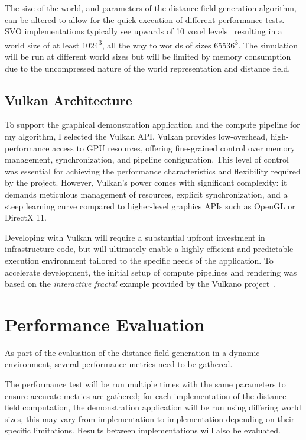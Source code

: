 The size of the world, and parameters of the distance field generation algorithm, can be altered to allow for the quick
execution of different performance tests. SVO implementations typically see upwards of 10 voxel
levels~\cite{laine2010efficient} resulting in a world size of at least 1024\textsuperscript{3}, all the way to worlds of
sizes 65536\textsuperscript{3}. The simulation will be run at different world sizes but will be limited by memory
consumption due to the uncompressed nature of the world representation and distance field.

\subsection{Vulkan Architecture}
To support the graphical demonstration application and the compute pipeline for my algorithm, I selected the Vulkan API.
Vulkan provides low-overhead, high-performance access to GPU resources, offering fine-grained control over memory
management, synchronization, and pipeline configuration. This level of control was essential for achieving the
performance characteristics and flexibility required by the project. However, Vulkan's power comes with significant
complexity: it demands meticulous management of resources, explicit synchronization, and a steep learning curve compared
to higher-level graphics APIs such as OpenGL or DirectX 11.

Developing with Vulkan will require a substantial upfront investment in infrastructure code, but will ultimately enable
a highly efficient and predictable execution environment tailored to the specific needs of the application. To
accelerate development, the initial setup of compute pipelines and rendering was based on the
\textit{interactive fractal} example provided by the Vulkano project~\cite{vulkano-example}.

\section{Performance Evaluation}\label{sec:perf_eval}
As part of the evaluation of the distance field generation in a dynamic environment, several performance metrics need to
be gathered.

The performance test will be run multiple times with the same parameters to ensure accurate metrics are gathered; for
each implementation of the distance field computation, the demonstration application will be run using differing world
sizes, this may vary from implementation to implementation depending on their specific limitations. Results between
implementations will also be evaluated.

